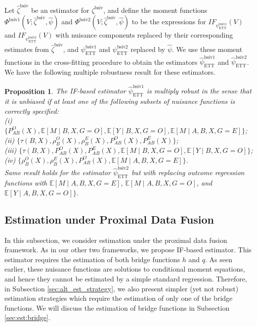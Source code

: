 \documentclass[10pt]{article}
\newtheorem{proposition}{Proposition}
\begin{document}
Let $\hat\zeta^{\text{bsiv}}$ be an estimator for $\zeta^{\text{bsiv}}$, and define the moment functions $\Phi^{\text{bsiv1}}(V; \hat\zeta^{\text{bsiv}}, \hat\psi)$ and $\Phi^{\text{bsiv2}}(V; \hat\zeta^{\text{bsiv}}, \hat\psi)$ to be the expressions for $IF_{\psi^{\text{bsiv1}}_{\text{ETT}}}(V)$ and $IF_{\psi^{\text{bsiv2}}_{\text{ETT}}}(V)$ with nuisance components replaced by their corresponding estimates from $\hat\zeta^{\text{bsiv}}$, and $\psi^{\text{bsiv1}}_{\text{ETT}}$ and $\psi^{\text{bsiv2}}_{\text{ETT}}$ replaced by $\hat\psi$. We use these moment functions in the cross-fitting procedure to obtain the estimators $\hat\psi^{\text{bsiv1}}_{\text{ETT}}$ and $\hat\psi^{\text{bsiv2}}_{\text{ETT}}$. We have the following multiple robustness result for these estimators.
\begin{proposition}
\label{prop:DR:BSIV_ett}
The IF-based estimator $\hat\psi^{\text{bsiv1}}_{\text{ETT}}$ is multiply robust in the sense that it is unbiased if at least one of the following subsets of nuisance functions is correctly specified:\\
        (i) $\{P_{AB}^O(X),\mathbb{E}[M\mid B,X,G=O],\mathbb{E}[Y\mid B,X,G=O],\mathbb{E}[M\mid A,B,X,G=E]\}$;\\
        (ii) $\{\tau(B,X),\rho_{B}^O(X),\rho_{B}^E(X),P_{AB}^O(X),P_{AB}^E(X)\}$;\\
        (iii) $\{\tau(B,X),P_{AB}^O(X),P_{AB}^E(X),\mathbb{E}[M\mid B,X,G=O],\mathbb{E}[Y\mid B,X,G=O]\}$;\\
        (iv) $\{\rho_{B}^O(X),\rho_{B}^E(X),P_{AB}^O(X),\mathbb{E}[M\mid A,B,X,G=E]\}$.\\
Same result holds for the estimator $\hat\psi^{\text{bsiv2}}_{\text{ETT}}$ 
but with replacing outcome regression functions with
$\mathbb{E}[M\mid A,B,X,G=E]$,
$\mathbb{E}[M\mid A,B,X,G=O]$, and
$\mathbb{E}[Y\mid A,B,X,G=O]\}$.
\end{proposition}


\subsection{Estimation under Proximal Data Fusion}


In this subsection, we consider estimation under the proximal data fusion framework. As in
our other two frameworks, we propose IF-based estimator. This estimator requires the estimation of both bridge functions $h$ and $q$. As seen earlier, these nuisance functions
are solutions to conditional moment equations, and hence they cannot be estimated by a
simple standard regression. Therefore, in Subsection \ref{sec:alt_est_strategy}, we also present simpler (yet not robust) estimation strategies which require the estimation of only one of the bridge functions. We will discuss the estimation of bridge functions in Subsection \ref{sec:est:bridge}.
\end{document}
